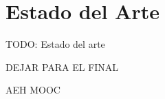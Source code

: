 \chapter{Estado del Arte\label{sec:estado_del_arte}}

TODO: Estado del arte

DEJAR PARA EL FINAL

AEH
MOOC